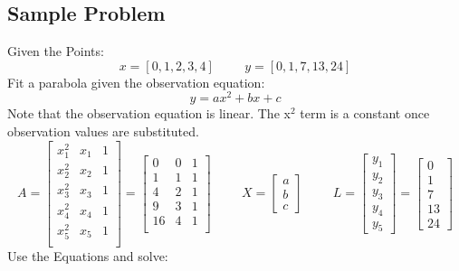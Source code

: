 \subsection{Sample Problem}
Given the Points: 
\[
x = [0,1,2,3,4] \hspace{1cm} y = [0,1,7,13,24]
\]
Fit a parabola given the observation equation:
\[
y = a x^2 +b x + c
\]
Note that the observation equation is linear. The x$^2$ term is a constant once observation values are substituted.
\[
A = \begin{bmatrix}
x_1^2 & x_1 & 1 \\
x_2^2 & x_2 & 1 \\
x_3^2 & x_3 & 1 \\
x_4^2 & x_4 & 1 \\
x_5^2 & x_5 & 1 \\
\end{bmatrix} =
\begin{bmatrix}
0 & 0 & 1 \\
1 & 1 & 1 \\
4 & 2 & 1 \\
9 & 3 & 1 \\
16 & 4 & 1 \\
\end{bmatrix}
\hspace{1cm}
X = 
\begin{bmatrix}
a \\ b \\ c 
\end{bmatrix}
\hspace{1cm}
L =
\begin{bmatrix}
y_1 \\ y_2 \\ y_3 \\ y_4 \\ y_5
\end{bmatrix} = 
\begin{bmatrix}
0 \\ 1 \\ 7 \\ 13 \\ 24
\end{bmatrix}
\]
Use the Equations and solve:
